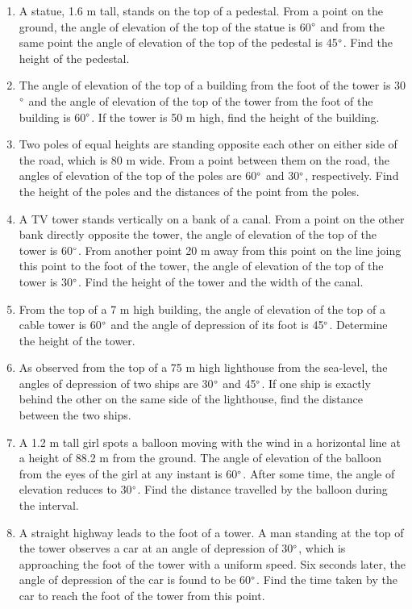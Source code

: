 \begin{enumerate}[label=\arabic*.,ref=\thesubsection.\theenumi]
\item A statue, 1.6 m tall, stands on the top of a pedestal. From a point on the ground, the angle of elevation of the top of the statue is 60$\degree$ and from the same point the angle of elevation of the top of the pedestal is 45$\degree$. Find the height of the pedestal.
\item The angle of elevation of the top of a building from the foot of the tower is 30$\degree$ and the angle of elevation of the top of the tower from the foot of the building is 60$\degree$. If the tower is 50 m high, find the height of the building.
\item Two poles of equal heights are standing opposite each other on either side of the road, which is 80 m wide. From a point between them on the road, the angles of elevation of the top of the poles are 60$\degree$ and 30$\degree$, respectively. Find the height of the poles and the distances of the point from the poles.
\item A TV tower stands vertically on a bank of a canal. From a point on the other bank directly opposite the tower, the angle of elevation of the top of the tower is 60$\degree$. From another point 20 m away from this point on the line joing this point to the foot of the tower, the angle of elevation of the top of the tower is 30$\degree$. Find the height of the tower and the width of the canal.
\item From the top of a 7 m high building, the angle of elevation of the top of a cable tower is 60$\degree$ and the angle of depression of its foot is 45$\degree$. Determine the height of the tower.
\item As observed from the top of a 75 m high lighthouse from the sea-level, the angles of depression of two ships are 30$\degree$ and 45$\degree$. If one ship is exactly behind the other on the same side of the lighthouse, find the distance between the two ships.
\item A 1.2 m tall girl spots a balloon moving with the wind in a horizontal line at a height of 88.2 m from the ground. The angle of elevation of the balloon from the eyes of the girl at any instant is 60$\degree$. After some time, the angle of elevation reduces to 30$\degree$. Find the distance travelled by the balloon during the interval.
\item A straight highway leads to the foot of a tower. A man standing at the top of the tower observes a car at an angle of depression of 30$\degree$, which is approaching the foot of the tower with a uniform speed. Six seconds later, the angle of depression of the car is found to be 60$\degree$. Find the time taken by the car to reach the foot of the tower from this point.

\end{enumerate}
